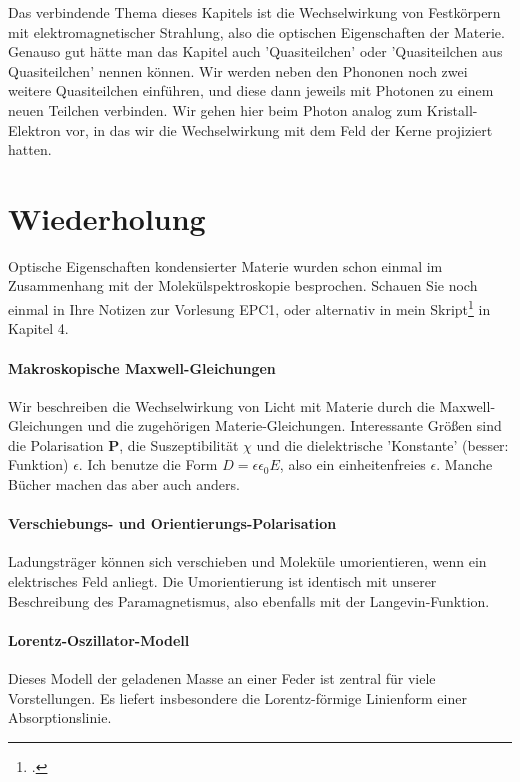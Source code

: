 Das verbindende Thema dieses Kapitels ist die Wechselwirkung von Festkörpern mit elektromagnetischer Strahlung, also die optischen Eigenschaften der Materie. Genauso gut hätte man das Kapitel auch 'Quasiteilchen' oder 'Quasiteilchen aus Quasiteilchen' nennen können. Wir werden neben den Phononen noch zwei weitere Quasiteilchen einführen, und diese dann jeweils mit Photonen zu einem neuen Teilchen verbinden. Wir gehen hier beim Photon analog zum Kristall-Elektron vor, in das wir die Wechselwirkung mit dem Feld der Kerne projiziert hatten.

\section*{Wiederholung}

Optische Eigenschaften kondensierter Materie wurden schon einmal im Zusammenhang mit der Molekülspektroskopie besprochen. Schauen Sie noch einmal in Ihre Notizen zur Vorlesung EPC1, oder alternativ in mein Skript\footcite{lippitz_epc1} in Kapitel 4.

\paragraph*{Makroskopische Maxwell-Gleichungen} Wir beschreiben die Wechselwirkung von Licht mit Materie durch die Maxwell-Gleichungen und die zugehörigen Materie-Gleichungen. Interessante Größen sind die Polarisation $\bm{P}$, die Suszeptibilität $\chi$ und die dielektrische 'Konstante' (besser: Funktion) $\epsilon$. Ich benutze die Form $D = \epsilon \epsilon_0 E$, also ein einheitenfreies $\epsilon$. Manche Bücher machen das aber auch anders.

\paragraph*{Verschiebungs- und Orientierungs-Polarisation} Ladungsträger können sich verschieben und Moleküle umorientieren, wenn ein elektrisches Feld anliegt. Die Umorientierung ist identisch mit unserer Beschreibung des Paramagnetismus, also ebenfalls mit der Langevin-Funktion.

\paragraph*{Lorentz-Oszillator-Modell} Dieses Modell der geladenen Masse an einer Feder ist zentral für viele Vorstellungen. Es liefert insbesondere die Lorentz-förmige Linienform einer Absorptionslinie.

